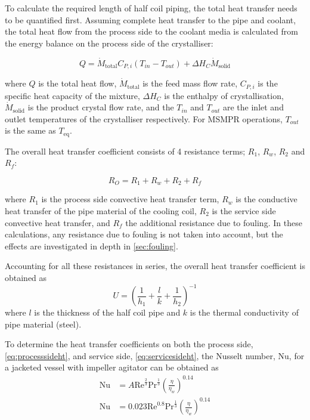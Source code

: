 To calculate the required length of half coil piping, the total heat transfer needs to be quantified first. Assuming complete heat transfer to the pipe and coolant, the total heat flow from the process side to the coolant media is calculated from the energy balance on the process side of the crystalliser:

\begin{equation} \label{eq:energy balance}
    Q =  \dot{M}_{\mathrm{total}} C_{P,i} (T_{in}-T_{out}) + \Delta H_{C} \dot{M}_{\mathrm{solid}}
\end{equation}

\noindent where $Q$ is the total heat flow, $\dot{M}_{\mathrm{total}}$ is the feed mass flow rate, $C_{P,i}$ is the specific heat capacity of the mixture, $\Delta H_{C}$ is the enthalpy of crystallisation, $\dot{M}_{\mathrm{solid}}$ is the product crystal flow rate, and the $T_{in}$ and $T_{out}$ are the inlet and outlet temperatures of the crystalliser respectively. For MSMPR operations, $T_{out}$ is the same as $T_{\mathrm{eq}}$. 


The overall heat transfer coefficient consists of 4 resistance terms; $R_1$, $R_w$, $R_2$ and $R_f$:

\begin{equation} \label{eq:resistht}
    R_O = R_1 + R_w + R_2 + R_f
\end{equation}

\noindent where $R_1$ is the process side convective heat transfer term, $R_w$ is the conductive heat transfer of the pipe material of the cooling coil, $R_2$ is the service side convective heat transfer, and $R_f$ the additional resistance due to fouling. In these calculations, any resistance due to fouling is not taken into account, but the effects are investigated in depth in \cref{sec:fouling}. 

Accounting for all these resistances in series, the overall heat transfer coefficient is obtained as 
\begin{equation} \label{eq:energy balance}
    U = \left(\frac{1}{h_1} + \frac{l}{k}   + \frac{1}{h_2 } \right)^{-1}
\end{equation}
where $l$ is the thickness of the half coil pipe and $k$ is the thermal conductivity of pipe material (steel).

To determine the heat transfer coefficients on both the process side, \cref{eq:processsideht}, and service side, \cref{eq:servicesideht}, the Nusselt number, $\mathrm{Nu}$, for a jacketed vessel with impeller agitator can be obtained as \cite{carpenter_agitated_2011}
\begin{align} 
    \mathrm{Nu} &= A\mathrm{Re}^{\frac{2}{3}}\mathrm{Pr}^{\frac{1}{3}}\left( \frac{\eta}{\eta_w} \right)^{0.14} \label{eq:processsideht} \\
    \mathrm{Nu} &= 0.023\mathrm{Re}^{0.8}\mathrm{Pr}^{\frac{1}{3}} \left( \frac{\eta}{\eta_w} \right)^{0.14} \label{eq:servicesideht}
\end{align}

